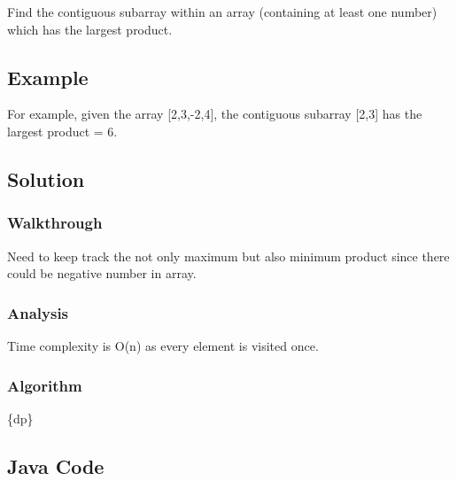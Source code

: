 \documentclass[]{book}
\begin{document}
Find the contiguous subarray within an array (containing at least one number) which has the largest product.

\hypertarget{example-25}{%
\subsection{Example}\label{example-25}}

For example, given the array {[}2,3,-2,4{]}, the contiguous subarray {[}2,3{]} has the largest product = 6.

\hypertarget{solution-20}{%
\subsection{Solution}\label{solution-20}}

\hypertarget{walkthrough-24}{%
\subsubsection{Walkthrough}\label{walkthrough-24}}

Need to keep track the not only maximum but also minimum product since there could be negative number in array.

\hypertarget{analysis-27}{%
\subsubsection{Analysis}\label{analysis-27}}

Time complexity is O(n) as every element is visited once.

\hypertarget{algorithm-27}{%
\subsubsection{Algorithm}\label{algorithm-27}}

\{dp\}

\hypertarget{java-code-23}{%
\subsection{Java Code}\label{java-code-23}}
\end{document}
